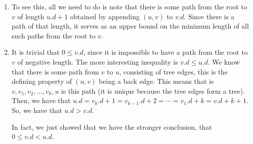 \documentclass{article}
\begin{document}
\begin{enumerate}[a)]
\begin{enumerate}[1.]
\item
To see this, all we need to do is note that there is some path from the root to $v$ of length $u.d+1$ obtained by appending $(u,v)$ to $v.d$. Since there is a path of that length, it serves as an upper bound on the minimum length of all such paths from the root to $v$.
\item
It is trivial that $0\le v.d$, since it is impossible to have a path from the root to $v$ of negative length. The more interesting inequality is $v.d\le u.d$. We know that there is some path from $v$ to $u$, consisting of tree edges, this is the defining property of $(u,v)$ being a back edge. This means that is $v,v_1,v_2,\ldots, v_k,u$ is this path (it is unique because the tree edges form a tree). Then, we have that $u.d = v_k.d +1 = v_{k-1}.d + 2 = \cdots = v_1.d + k = v.d + k+1$. So, we have that $u.d > v.d$.

In fact, we just showed that we have the stronger conclusion, that $0\le v.d < u.d$.
\end{enumerate}
\end{enumerate}
\end{document}
